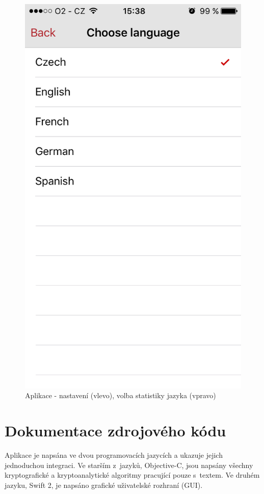 \documentclass[glossaries, index]{kidiplom}
\begin{document}
\begin{figure}[htbp]
\includegraphics[scale=0.3]{graphics/app/languages.png}
\caption{Aplikace - nastavení (vlevo), volba statistiky jazyka (vpravo)}
\label{app-settings}
\end{figure}





\newpage

\section{Dokumentace zdrojového kódu}
Aplikace je napsána ve dvou programovacích jazycích a ukazuje jejich jednoduchou integraci. Ve starším z~jazyků, Objective-C, jsou napsány všechny kryptografické a kryptoanalytické algoritmy pracující pouze s~textem. Ve druhém jazyku, Swift 2, je napsáno grafické uživatelské rozhraní (GUI).
\end{document}
